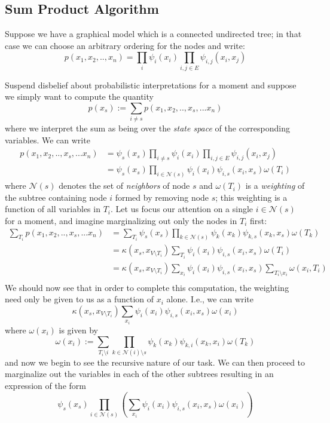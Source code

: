\subsection{Sum Product Algorithm}

Suppose we have a graphical model which is a connected undirected tree; in that case we can choose an arbitrary ordering for the nodes and write:
$$
p(x_1, x_2, .., x_n) = \prod_i \psi_i(x_i) \prod_{i, j \in E} \psi_{i,j}(x_i, x_j)
$$

Suspend disbelief about probabilistic interpretations for a moment and suppose we simply want to compute the quantity
$$
p(x_s) := \sum_{i \neq s} p(x_1, x_2, ..,x_s,... x_n)
$$
where we interpret the sum as being over the \emph{state space} of the corresponding variables.  We can write
\begin{equation*}
\begin{aligned}
p(x_1, x_2, ..,x_s,... x_n) &= \psi_s(x_s) \prod_{i\neq s} \psi_i(x_i) \prod_{i, j \in E} \psi_{i,j}(x_i, x_j)\\
&= \psi_s(x_s) \prod_{i \in \mathcal{N}(s)} \psi_i(x_i) \psi_{i,s}(x_i, x_s) \omega(T_i)
\end{aligned}
\end{equation*}
where $\mathcal{N}(s)$ denotes the set of \emph{neighbors} of node $s$ and $\omega(T_i)$ is a \emph{weighting} of the subtree containing node $i$ formed by removing node $s$; this weighting is a function of all variables in $T_i$.  Let us focus our attention on a single $i\in\mathcal{N}(s)$ for a moment, and imagine marginalizing out only the nodes in $T_i$ first:
\begin{equation*}
\begin{aligned}
\sum_{T_i} p(x_1, x_2, ..,x_s,... x_n) &= \sum_{T_i}\psi_s(x_s) \prod_{k \in \mathcal{N}(s)} \psi_k(x_k) \psi_{k,s}(x_k, x_s) \omega(T_k) \\
&= \kappa(x_s, x_{V\setminus T_i}) \sum_{T_i} \psi_i(x_i) \psi_{i,s}(x_i, x_s) \omega(T_i)\\
&= \kappa(x_s, x_{V\setminus T_i}) \sum_{x_i} \psi_i(x_i) \psi_{i,s}(x_i, x_s) \sum_{T_i \setminus x_i} \omega(x_i, T_i)\\
\end{aligned}
\end{equation*}
We should now see that in order to complete this computation, the weighting need only be given to us as a function of $x_i$ alone.  I.e., we can write
$$
\kappa(x_s, x_{V\setminus T_i}) \sum_{x_i} \psi_i(x_i) \psi_{i,s}(x_i, x_s) \omega(x_i)
$$
where $\omega(x_i)$ is given by
$$
\omega(x_i) := \sum_{T_i \setminus i}\prod_{k \in \mathcal{N}(i)\setminus {s}} \psi_k(x_k) \psi_{k,i}(x_k, x_i) \omega(T_k)
$$
and now we begin to see the recursive nature of our task.  We can then proceed to marginalize out the variables in each of the other subtrees resulting in an expression of the form
$$
\psi_s(x_s)\prod_{i\in\mathcal{N}(s)}\left( \sum_{x_i} \psi_i(x_i) \psi_{i,s}(x_i, x_s) \omega(x_i)\right)
$$

